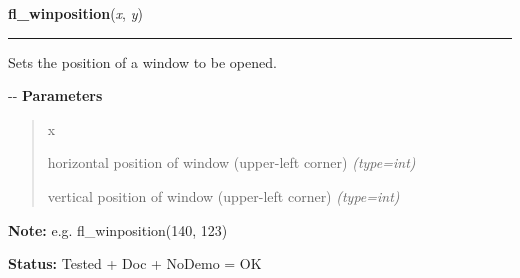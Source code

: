 \hspace{.8\funcindent}\begin{boxedminipage}{\funcwidth}

    \raggedright \textbf{fl\_winposition}(\textit{x}, \textit{y})

    \vspace{-1.5ex}

    \rule{\textwidth}{0.5\fboxrule}
\setlength{\parskip}{2ex}

Sets the position of a window to be opened.

-{}-
\setlength{\parskip}{1ex}
      \textbf{Parameters}
      \vspace{-1ex}

      \begin{quote}
        \begin{Ventry}{x}

          \item[x]


horizontal position of window (upper-left corner)
            {\it (type=int)}

          \item[y]


vertical position of window (upper-left corner)
            {\it (type=int)}

        \end{Ventry}

      \end{quote}

\textbf{Note:} 
e.g. fl\_winposition(140, 123)


\textbf{Status:} 
Tested + Doc + NoDemo = OK


    \end{boxedminipage}

    \label{xformslib:flxbasic:fl_winposition}

    \vspace{0.5ex}

